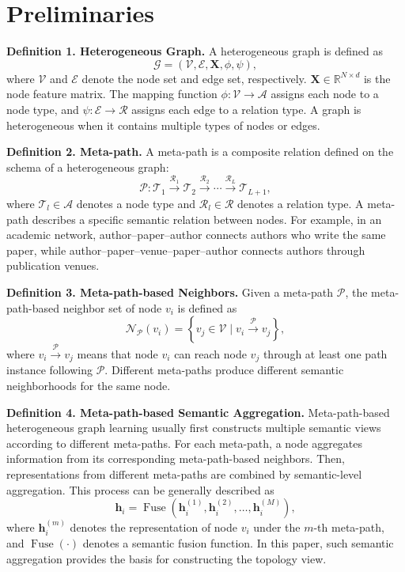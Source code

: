 ﻿\section{Preliminaries}
\label{sec:preliminaries}

\noindent\textbf{Definition 1. Heterogeneous Graph.}
A heterogeneous graph is defined as
\begin{equation}
\mathcal{G}=(\mathcal{V},\mathcal{E},\mathbf{X},\phi,\psi),
\end{equation}
where $\mathcal{V}$ and $\mathcal{E}$ denote the node set and edge set, respectively.
$\mathbf{X}\in\mathbb{R}^{N\times d}$ is the node feature matrix.
The mapping function $\phi:\mathcal{V}\rightarrow\mathcal{A}$ assigns each node to a node type, and $\psi:\mathcal{E}\rightarrow\mathcal{R}$ assigns each edge to a relation type.
A graph is heterogeneous when it contains multiple types of nodes or edges.

\noindent\textbf{Definition 2. Meta-path.}
A meta-path is a composite relation defined on the schema of a heterogeneous graph:
\begin{equation}
\mathcal{P}:
\mathcal{T}_1 \xrightarrow{\mathcal{R}_1}
\mathcal{T}_2 \xrightarrow{\mathcal{R}_2}
\cdots
\xrightarrow{\mathcal{R}_L}
\mathcal{T}_{L+1},
\end{equation}
where $\mathcal{T}_l\in\mathcal{A}$ denotes a node type and $\mathcal{R}_l\in\mathcal{R}$ denotes a relation type.
A meta-path describes a specific semantic relation between nodes.
For example, in an academic network, author--paper--author connects authors who write the same paper, while author--paper--venue--paper--author connects authors through publication venues.

\noindent\textbf{Definition 3. Meta-path-based Neighbors.}
Given a meta-path $\mathcal{P}$, the meta-path-based neighbor set of node $v_i$ is defined as
\begin{equation}
\mathcal{N}_{\mathcal{P}}(v_i)
= \left\{ v_j \in \mathcal{V} \mid v_i \xrightarrow{\mathcal{P}} v_j \right\}, 
\end{equation}
where $v_i \xrightarrow{\mathcal{P}} v_j$ means that node $v_i$ can reach node $v_j$ through at least one path instance following $\mathcal{P}$.
Different meta-paths produce different semantic neighborhoods for the same node.

\noindent\textbf{Definition 4. Meta-path-based Semantic Aggregation.}
Meta-path-based heterogeneous graph learning usually first constructs multiple semantic views according to different meta-paths.
For each meta-path, a node aggregates information from its corresponding meta-path-based neighbors.
Then, representations from different meta-paths are combined by semantic-level aggregation.
This process can be generally described as
\begin{equation}
\mathbf{h}_i
=
\operatorname{Fuse}
\left(
\mathbf{h}_i^{(1)},\mathbf{h}_i^{(2)},\ldots,\mathbf{h}_i^{(M)}
\right),
\end{equation}
where $\mathbf{h}_i^{(m)}$ denotes the representation of node $v_i$ under the $m$-th meta-path, and $\operatorname{Fuse}(\cdot)$ denotes a semantic fusion function.
In this paper, such semantic aggregation provides the basis for constructing the topology view.

